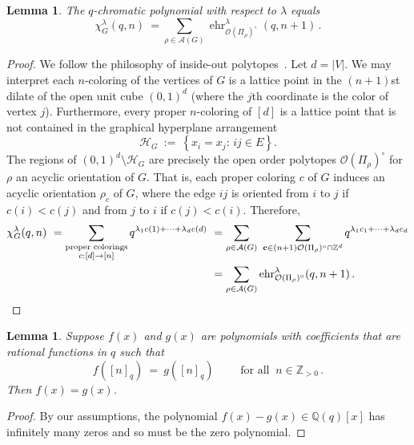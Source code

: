 \documentclass[11pt]{amsart}
\newtheorem{lemma}[theorem]{Lemma}
\newcommand\ehr{\operatorname{ehr}}
\newcommand\ZZ{\mathbb{Z}}
\newcommand\QQ{\mathbb{Q}}
\begin{document}
\begin{lemma}\label{lem:chiintermsofehr}
The $q$-chromatic polynomial with respect to $\lambda$ equals
\[
\chi_G^\lambda(q,n) \ = \sum_{\rho\in \mathcal{A}(G)}
\ehr_{\mathcal{O}(\Pi_\rho)^\circ}^\lambda(q,n+1) \, .
\]
\end{lemma}

\begin{proof}
We follow the philosophy of inside-out polytopes~\cite{iop}. 
Let $d = |V|$.
We may interpret each $n$-coloring of the vertices of $G$ is a lattice point in the $(n+1)$st dilate of the open unit cube $(0,1)^d$ (where the $j$th coordinate is the color of vertex $j$). 
Furthermore, every proper $n$-coloring of $[d]$ is a lattice point that is not contained in the graphical hyperplane arrangement
\begin{equation}\label{eq:hyparr}
\mathcal{H}_G \ := \ \left\{ x_i=x_j: \, ij \in E \right\}.
\end{equation}
The regions of $(0,1)^d\setminus \mathcal{H}_G$ are precisely the open order polytopes $\mathcal{O}(\Pi_\rho)^\circ$ for $\rho$ an acyclic orientation of $G$. 
That is, each proper coloring $c$ of $G$ induces an acyclic orientation $\rho_c$ of $G$, where the edge $ij$ is oriented from $i$ to $j$ if $c(i)<c(j)$ and from $j$ to $i$ if $c(j)<c(i)$.
Therefore,
\begin{align*}
\chi_G^\lambda(q,n)
  \ = \sum_{\substack{\text{proper colorings}\\ c:[d]\to[n]}} q^{\lambda_1c(1)+\cdots +\lambda_d c(d)}
  \ &=\sum_{\rho\in \mathcal{A}(G)} \ \sum_{\mathbf{c}\in (n+1)\mathcal{O}(\Pi_\rho)^\circ \cap \ZZ^d} q^{\lambda_1c_1+\cdots +\lambda_d c_d} \\
&=\sum_{\rho\in\mathcal{A}(G)} \ehr_{\mathcal{O}(\Pi_\rho)^\circ}^\lambda(q,n+1) \, . \qedhere
\end{align*}
\end{proof}

\begin{lemma}\label{lem:unique}
Suppose $f(x)$ and $g(x)$ are polynomials with coefficients that are rational functions in $q$ such that
\[
  f([n]_q) \ = \ g([n]_q)
  \qquad \text{ for all } \ n \in \ZZ_{ >0 } \, .
\]
Then $f(x) = g(x)$.
\end{lemma}

\begin{proof}
By our assumptions, the polynomial $f(x) - g(x) \in \QQ(q)[x]$ has infinitely many zeros and so must be the zero polynomial.
\end{proof}
\end{document}
